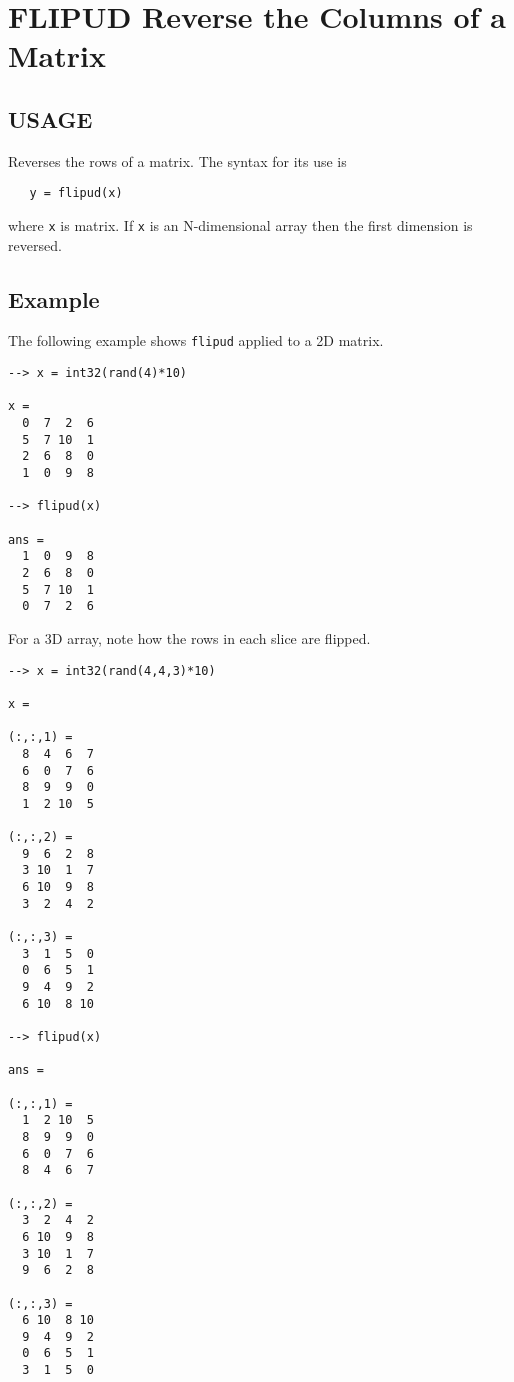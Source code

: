 \section{FLIPUD Reverse the Columns of a Matrix}

\subsection{USAGE}

Reverses the rows of a matrix.  The syntax for its use is
\begin{verbatim}
   y = flipud(x)
\end{verbatim}
where \verb|x| is matrix.  If \verb|x| is an N-dimensional array then
the first dimension is reversed.
\subsection{Example}

The following example shows \verb|flipud| applied to a 2D matrix.
\begin{verbatim}
--> x = int32(rand(4)*10)

x = 
  0  7  2  6 
  5  7 10  1 
  2  6  8  0 
  1  0  9  8 

--> flipud(x)

ans = 
  1  0  9  8 
  2  6  8  0 
  5  7 10  1 
  0  7  2  6 
\end{verbatim}
For a 3D array, note how the rows in each slice are flipped.
\begin{verbatim}
--> x = int32(rand(4,4,3)*10)

x = 

(:,:,1) = 
  8  4  6  7 
  6  0  7  6 
  8  9  9  0 
  1  2 10  5 

(:,:,2) = 
  9  6  2  8 
  3 10  1  7 
  6 10  9  8 
  3  2  4  2 

(:,:,3) = 
  3  1  5  0 
  0  6  5  1 
  9  4  9  2 
  6 10  8 10 

--> flipud(x)

ans = 

(:,:,1) = 
  1  2 10  5 
  8  9  9  0 
  6  0  7  6 
  8  4  6  7 

(:,:,2) = 
  3  2  4  2 
  6 10  9  8 
  3 10  1  7 
  9  6  2  8 

(:,:,3) = 
  6 10  8 10 
  9  4  9  2 
  0  6  5  1 
  3  1  5  0 
\end{verbatim}
